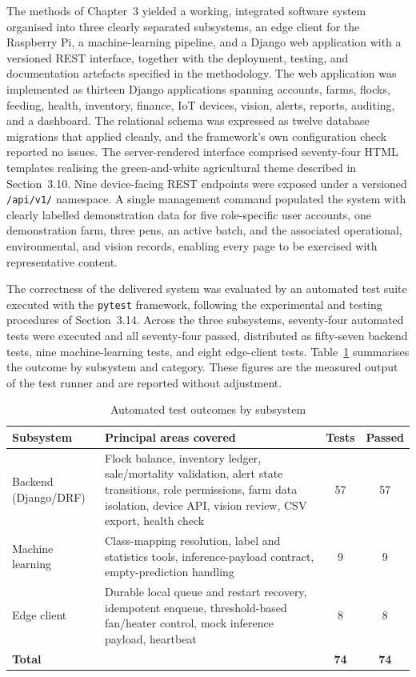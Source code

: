 \documentclass[12pt,a4paper]{report}
\begin{document}
The methods of Chapter~3 yielded a working, integrated software system organised into three clearly separated subsystems, an edge client for the Raspberry Pi, a machine-learning pipeline, and a Django web application with a versioned REST interface, together with the deployment, testing, and documentation artefacts specified in the methodology. The web application was implemented as thirteen Django applications spanning accounts, farms, flocks, feeding, health, inventory, finance, IoT devices, vision, alerts, reports, auditing, and a dashboard. The relational schema was expressed as twelve database migrations that applied cleanly, and the framework's own configuration check reported no issues. The server-rendered interface comprised seventy-four HTML templates realising the green-and-white agricultural theme described in Section~3.10. Nine device-facing REST endpoints were exposed under a versioned \texttt{/api/v1/} namespace. A single management command populated the system with clearly labelled demonstration data for five role-specific user accounts, one demonstration farm, three pens, an active batch, and the associated operational, environmental, and vision records, enabling every page to be exercised with representative content.

The correctness of the delivered system was evaluated by an automated test suite executed with the \texttt{pytest} framework, following the experimental and testing procedures of Section~3.14. Across the three subsystems, seventy-four automated tests were executed and all seventy-four passed, distributed as fifty-seven backend tests, nine machine-learning tests, and eight edge-client tests. Table~\ref{tab:testsummary} summarises the outcome by subsystem and category. These figures are the measured output of the test runner and are reported without adjustment.

\begin{table}[tbp]
\centering
\caption{Automated test outcomes by subsystem}
\label{tab:testsummary}
\begin{tabularx}{\textwidth}{@{}lXcc@{}}
\toprule
\textbf{Subsystem} & \textbf{Principal areas covered} & \textbf{Tests} & \textbf{Passed} \\
\midrule
Backend (Django/DRF) & Flock balance, inventory ledger, sale/mortality validation, alert state transitions, role permissions, farm data isolation, device API, vision review, CSV export, health check & 57 & 57 \\
Machine learning & Class-mapping resolution, label and statistics tools, inference-payload contract, empty-prediction handling & 9 & 9 \\
Edge client & Durable local queue and restart recovery, idempotent enqueue, threshold-based fan/heater control, mock inference payload, heartbeat & 8 & 8 \\
\midrule
\textbf{Total} & & \textbf{74} & \textbf{74} \\
\bottomrule
\end{tabularx}
\end{table}
\end{document}
